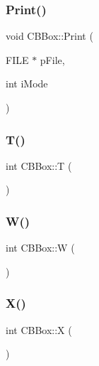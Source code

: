 \subsubsection{\texorpdfstring{Print()}{Print()}}
{\footnotesize\ttfamily void C\+B\+Box\+::\+Print (\begin{DoxyParamCaption}\item[{F\+I\+LE $\ast$}]{p\+File,  }\item[{int}]{i\+Mode }\end{DoxyParamCaption})}

\mbox{\label{classCBBox_a4f032d03aa68e110aa31217cd687c417}} 
\subsubsection{\texorpdfstring{T()}{T()}}
{\footnotesize\ttfamily int C\+B\+Box\+::T (\begin{DoxyParamCaption}{ }\end{DoxyParamCaption})\hspace{0.3cm}{\ttfamily [inline]}}

\mbox{\label{classCBBox_a0b95aec1053ef1161c6129d61c8c3144}} 
\subsubsection{\texorpdfstring{W()}{W()}}
{\footnotesize\ttfamily int C\+B\+Box\+::W (\begin{DoxyParamCaption}{ }\end{DoxyParamCaption})\hspace{0.3cm}{\ttfamily [inline]}}

\mbox{\label{classCBBox_a437bb0692398b1bb83d662b68beb0f3e}} 
\subsubsection{\texorpdfstring{X()}{X()}}
{\footnotesize\ttfamily int C\+B\+Box\+::X (\begin{DoxyParamCaption}{ }\end{DoxyParamCaption})\hspace{0.3cm}{\ttfamily [inline]}}

\mbox{\label{classCBBox_a5199b3a785f2bd06a53d8cd961c5a749}} 
